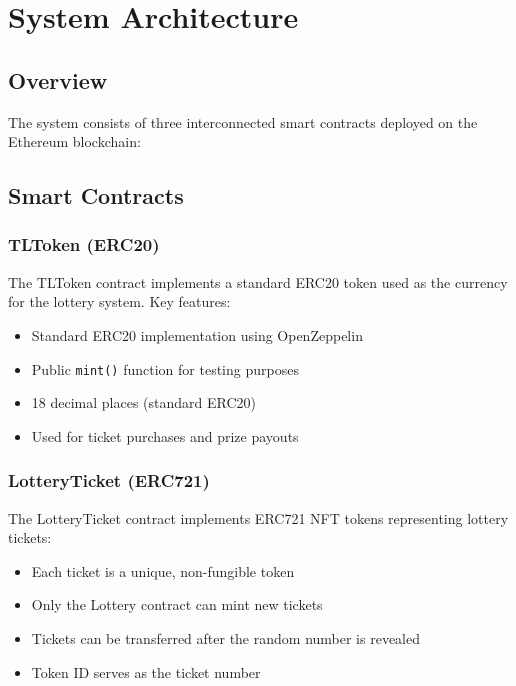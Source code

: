 \documentclass[12pt,a4paper]{article}
\begin{document}
\section{System Architecture}

\subsection{Overview}

The system consists of three interconnected smart contracts deployed on the Ethereum blockchain:

\subsection{Smart Contracts}

\subsubsection{TLToken (ERC20)}

The TLToken contract implements a standard ERC20 token used as the currency for the lottery system. Key features:
\begin{itemize}
    \item Standard ERC20 implementation using OpenZeppelin
    \item Public \texttt{mint()} function for testing purposes
    \item 18 decimal places (standard ERC20)
    \item Used for ticket purchases and prize payouts
\end{itemize}

\subsubsection{LotteryTicket (ERC721)}

The LotteryTicket contract implements ERC721 NFT tokens representing lottery tickets:
\begin{itemize}
    \item Each ticket is a unique, non-fungible token
    \item Only the Lottery contract can mint new tickets
    \item Tickets can be transferred after the random number is revealed
    \item Token ID serves as the ticket number
\end{itemize}
\end{document}
